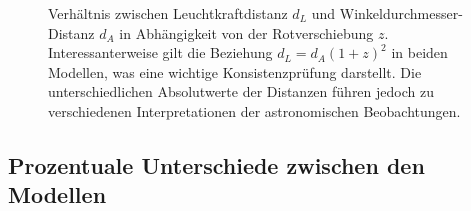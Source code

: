\documentclass[a4paper,12pt]{article}
\theoremstyle{definition}
\theoremstyle{remark}
\begin{document}
	\begin{figure}[H]
		\centering
		\caption{Verhältnis zwischen Leuchtkraftdistanz $d_L$ und Winkeldurchmesser-Distanz $d_A$ in Abhängigkeit von der Rotverschiebung $z$. Interessanterweise gilt die Beziehung $d_L = d_A (1+z)^2$ in beiden Modellen, was eine wichtige Konsistenzprüfung darstellt. Die unterschiedlichen Absolutwerte der Distanzen führen jedoch zu verschiedenen Interpretationen der astronomischen Beobachtungen.}
		\label{fig:distance_ratios}
	\end{figure}
	
	\subsection{Prozentuale Unterschiede zwischen den Modellen}
	
\end{document}
